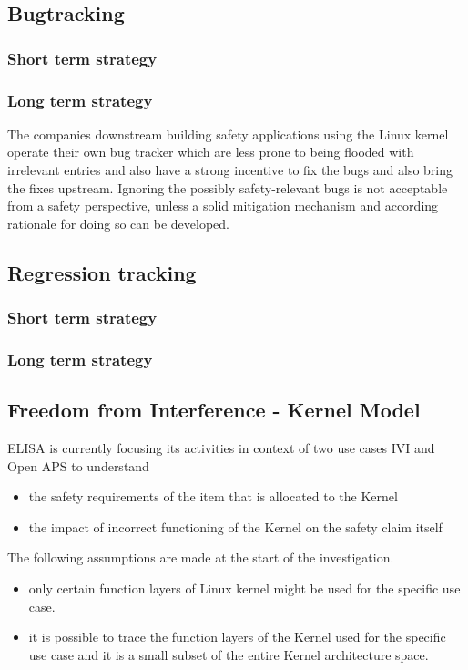 \documentclass[12pt]{ElisaPaper}
\begin{document}
\subsection{Bugtracking}

\subsubsection{Short term strategy}

\subsubsection{Long term strategy}
The companies downstream building safety applications using the Linux kernel operate their own bug tracker which are less prone to being flooded with irrelevant entries and also have a strong incentive to fix the bugs and also bring the fixes upstream. 
Ignoring the possibly safety-relevant bugs is not acceptable from a safety perspective, unless a solid mitigation mechanism and according rationale for doing so can be developed.

\subsection{Regression tracking}
\subsubsection{Short term strategy}
\subsubsection{Long term strategy}  

\subsection{Freedom from Interference - Kernel Model}
ELISA is currently focusing its activities in context of two use cases IVI and Open APS to understand
\begin{itemize} 
	\item the safety requirements of the item that is allocated to the Kernel
	\item the impact of incorrect functioning of the Kernel on the safety claim itself 
\end{itemize}
The following assumptions are made at the start of the investigation.
\begin{itemize}
	\item 	only certain function layers of Linux kernel might be used for the specific use case. 
	\item 	it is possible to trace the function layers of the Kernel used for the specific use case and it is a small subset of the entire Kernel architecture space.
\end{itemize} 
\end{document}
